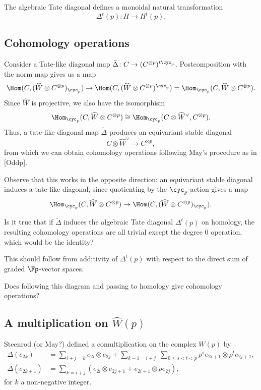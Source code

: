 \begin{lemma}
The algebraic Tate diagonal defines a monoidal natural transformation
\[
\Delta^t(p)\colon H \longrightarrow H^t(p).
\]
\end{lemma}



\subsection{Cohomology operations} Consider a Tate-like diagonal map $\tilde\Delta\colon C\to (C^{\otimes p})^{t\cyc_p}$. Postcomposition with the norm map gives us a map 
\[
\Hom(C,(\widehat W\otimes C^{\otimes p})_{\cyc_p})\to \Hom(C,(\widehat W\otimes C^{\otimes p})^{\cyc_p})=\Hom_{\cyc_p}(C,\widehat W\otimes C^{\otimes p}).
\]
Since $\widehat W$ is projective, we also have the isomorphism 
\[
\Hom_{\cyc_p}(C,\widehat W\otimes C^{\otimes p})\cong \Hom_{\cyc_p}(C\otimes \widehat W^\vee, C^{\otimes p}).
\]
Thus, a tate-like diagonal map $\tilde \Delta$  produces an equivariant stable diagonal 
\[
C\otimes \widehat W^\vee\to C^{\otimes p},
\]
from which we can obtain cohomology operations following May's procedure as in [Oddp]. 

Observe that this works in the opposite direction: an equivariant stable diagonal induces a tate-like diagonal, since quotienting by the $\cyc_p$-action gives a map 
\[
\Hom_{\cyc_p}(C,\widehat W\otimes C^{\otimes p})\to \Hom(C,(\widehat W\otimes C^{\otimes p})_{\cyc_p}).
\]
\begin{question} Is it true that if $\tilde \Delta$ induces the algebraic Tate diagonal $\Delta^t(p)$ on homology,  the resulting cohomology operations are all trivial except the degree $0$ operation, which would be the identity?
\end{question}
This should follow from additivity of $\Delta^t(p)$ with respect to the direct sum of graded  $\Fp$-vector spaces.

\begin{question} 
Does following this diagram and passing to homology give cohomology operations? 


\end{question}

\subsection{A multiplication on $\widehat W(p)$} Steenrod (or May?) defined a comultiplication on the complex $W(p)$ by
\begin{align*} 
\Delta(e_{2k})&= \sum_{i+j=k} e_{2i}\otimes e_{2j} + \sum_{k-1=i+j} \; \sum_{0\leq s<t<p} \rho^s e_{2i+1}\otimes \rho^t e_{2j+1}, \\ 
\Delta(e_{2k+1})&=  \sum_{k=i+j} \left (e_{2i}\otimes e_{2j+1} + e_{2i+1}\otimes \rho e_{2j}\right ),
\end{align*}
for $k$ a non-negative integer.

